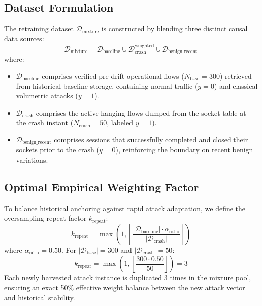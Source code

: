 \documentclass[12pt,a4paper,oneside]{report}
\begin{document}
\subsection{Dataset Formulation}
The retraining dataset $\mathcal{D}_{\text{mixture}}$ is constructed by blending three distinct causal data sources:
\begin{equation}
\mathcal{D}_{\text{mixture}} = \mathcal{D}_{\text{baseline}} \cup \mathcal{D}_{\text{crash}}^{\text{weighted}} \cup \mathcal{D}_{\text{benign\_recent}}
\end{equation}
where:
\begin{itemize}
    \item $\mathcal{D}_{\text{baseline}}$ comprises verified pre-drift operational flows ($N_{\text{base}} = 300$) retrieved from historical baseline storage, containing normal traffic ($y=0$) and classical volumetric attacks ($y=1$).
    \item $\mathcal{D}_{\text{crash}}$ comprises the active hanging flows dumped from the socket table at the crash instant ($N_{\text{crash}} = 50$, labeled $y=1$).
    \item $\mathcal{D}_{\text{benign\_recent}}$ comprises sessions that successfully completed and closed their sockets prior to the crash ($y=0$), reinforcing the boundary on recent benign variations.
\end{itemize}

\subsection{Optimal Empirical Weighting Factor}
To balance historical anchoring against rapid attack adaptation, we define the oversampling repeat factor $k_{\text{repeat}}$:
\begin{equation}
k_{\text{repeat}} = \max\left(1, \left\lfloor \frac{|\mathcal{D}_{\text{baseline}}| \cdot \alpha_{\text{ratio}}}{|\mathcal{D}_{\text{crash}}|} \right\rfloor\right)
\end{equation}
where $\alpha_{\text{ratio}} = 0.50$. For $|\mathcal{D}_{\text{base}}| = 300$ and $|\mathcal{D}_{\text{crash}}| = 50$:
\begin{equation}
k_{\text{repeat}} = \max\left(1, \left\lfloor \frac{300 \cdot 0.50}{50} \right\rfloor\right) = 3
\end{equation}
Each newly harvested attack instance is duplicated 3 times in the mixture pool, ensuring an exact 50\% effective weight balance between the new attack vector and historical stability.
\end{document}
